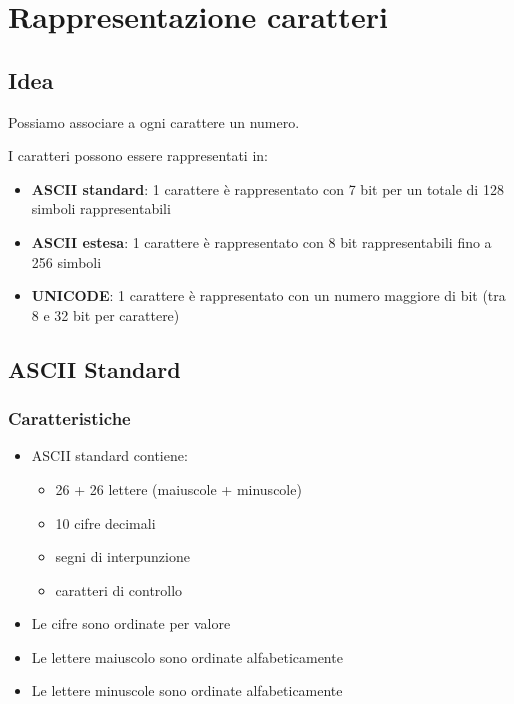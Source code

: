 \chapter{Rappresentazione caratteri}
\section{Idea}
Possiamo associare a ogni carattere un numero.

I caratteri possono essere rappresentati in:
\begin{itemize}
    \item \textbf{ASCII standard}: 1 carattere è rappresentato con 7 bit per un totale di 128 simboli rappresentabili
    \item \textbf{ASCII estesa}: 1 carattere è rappresentato con 8 bit rappresentabili fino a 256 simboli
    \item \textbf{UNICODE}: 1 carattere è rappresentato con un numero maggiore di bit (tra 8 e 32 bit per carattere)
\end{itemize}

\section{ASCII Standard}
\subsection{Caratteristiche}
\begin{itemize}
    \item ASCII standard contiene:
    \begin{itemize}
        \item 26 + 26 lettere (maiuscole + minuscole)
        \item 10 cifre decimali
        \item segni di interpunzione
        \item caratteri di controllo
    \end{itemize}

    \item Le cifre sono ordinate per valore
    \item Le lettere maiuscolo sono ordinate alfabeticamente
    \item Le lettere minuscole sono ordinate alfabeticamente
\end{itemize}

\newpage
